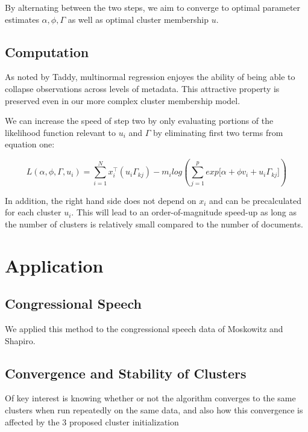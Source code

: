 \documentclass[12pt]{article}
\begin{document}
By alternating between the two steps, we aim to converge to optimal
parameter estimates $\alpha, \phi, \Gamma$ as well as optimal cluster
membership $u$.

\subsection{Computation}\label{computation}

As noted by Taddy, multinormal regression enjoyes the ability of being able to
collapse observations across levels of metadata. This attractive
property is preserved even in our more complex cluster membership model.

We can increase the speed of step two by only evaluating portions of the likelihood function relevant to $u_i$ and $\Gamma$ by eliminating first two terms from equation one:

\begin{equation} 
L(\alpha,\phi,\Gamma,u_i) = \sum_{i = 1}^{N}{ x_i^\top (u_i \Gamma_{kj})} - m_i log(\sum_{j = 1}^{p}{exp{\big[ \alpha + \phi v_i + u_i \Gamma_{kj} \big]}})
\end{equation}

In addition, the right hand side does not depend on $x_i$ and can be precalculated for each cluster $u_i$. This will lead to an order-of-magnitude speed-up as long as the number of clusters is relatively small compared to the number of documents. 



\section{Application}\label{application}

\subsection{Congressional Speech} 

We applied this method to the congressional speech data of Moskowitz and Shapiro. 

\subsection{Convergence and Stability of Clusters}

Of key interest is knowing whether or not the algorithm converges to the same clusters when run repeatedly on the same data, and also how this convergence is affected by the 3 proposed cluster initialization 
\end{document}
